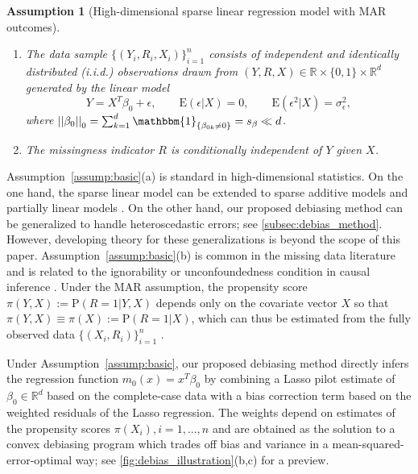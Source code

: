 \documentclass[ejsv2,noshowframe]{imsart}
\theoremstyle{plain}
\newtheorem{assumption}{Assumption}
\theoremstyle{definition}
\theoremstyle{remark}
\newcommand{\norm}[1]{\left|\left| #1 \right|\right|}
\begin{document}
\begin{assumption}[High-dimensional sparse linear regression model with MAR outcomes] 
	\leavevmode %
	\begin{enumerate}[label=(\alph*)]
		\label{assump:basic}
		\item The data sample $\{(Y_i,R_i,X_i)\}_{i=1}^n$ consists of independent and identically distributed (i.i.d.) observations drawn from $(Y, R, X) \in \mathbb{R} \times \{0,1\} \times \mathbb{R}^d$ generated by the linear model
		\begin{equation}
			\label{linear_reg}
			Y = X^T\beta_0 + \epsilon, \quad \quad \mathrm{E}\left(\epsilon \big| X\right) = 0, \quad\quad \mathrm{E}\left(\epsilon^2 \big| X\right) = \sigma_{\epsilon}^2, 
		\end{equation}
		where $\norm{\beta_0}_0 = \sum_{k=1}^d \mathbbm{1}_{\{\beta_{0k} \neq 0\}} = s_{\beta} \ll d$. 
		
		\item The missingness indicator $R$ is conditionally independent of $Y$ given $X$.
	\end{enumerate}
\end{assumption}

Assumption~\ref{assump:basic}(a) is standard in high-dimensional statistics. On the one hand, the sparse linear model can be extended to sparse additive models \citep{ravikumar2009sparse} and partially linear models \citep{muller2015partial,belloni2019valid}. On the other hand, our proposed debiasing method can be generalized to handle heteroscedastic errors; see \autoref{subsec:debias_method}. However, developing theory for these generalizations is beyond the scope of this paper. Assumption~\ref{assump:basic}(b) is common in the missing data literature \citep{tsiatis2007semiparametric,little2019statistical} and is related to the ignorability or unconfoundedness condition in causal inference \citep{imbens2004nonparametric}. Under the MAR assumption, the propensity score $\pi(Y, X) := \mathrm{P}(R=1|Y, X)$ depends only on the covariate vector $X$ so that $\pi(Y, X) \equiv \pi(X) := \mathrm{P}(R=1| X)$, which can thus be estimated from the fully observed data $\{(X_i,R_i)\}_{i=1}^n$ \citep{rosenbaum1983central}. 

Under Assumption~\ref{assump:basic}, our proposed debiasing method directly infers the regression function $m_0(x)=x^T\beta_0$ by combining a Lasso pilot estimate of $\beta_0\in \mathbb{R}^d$ based on the complete-case data with a bias correction term based on the weighted residuals of the Lasso regression. The weights depend on estimates of the propensity scores $\pi(X_i),i=1,...,n$ and are obtained as the solution to a convex debiasing program which trades off bias and variance in a mean-squared-error-optimal way; see \autoref{fig:debias_illustration}(b,c) for a preview.
\end{document}
